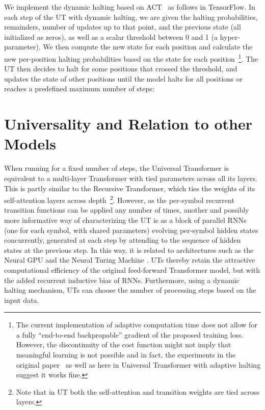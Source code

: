 We implement the dynamic halting based on ACT~\citep{graves2016adaptive} as follows in TensorFlow. In each step of the UT with dynamic halting, we are given the halting probabilities, remainders, number of updates up to that point, and the previous state (all initialized as zeros), as well as a scalar threshold between 0 and 1 (a hyper-parameter). We then compute the new state for each position and calculate the new per-position halting probabilities based on the state for each position~\footnote{The current implementation of adaptive computation time does not allow for a fully ``end-to-end backpropable'' gradient of the proposed training loss. However, the discontinuity of the cost function might not imply that meaningful learning is not possible and in fact, the experiments in the original paper~\citep{graves2016adaptive} as well as here in Universal Transformer with adaptive halting suggest it works fine.}. The UT then decides to halt for some positions that crossed the threshold, and updates the state of other positions until the model halts for all positions or reaches a predefined maximum number of steps:



\section{Universality and Relation to other Models}
\label{sec:related}
When running for a fixed number of steps, the Universal Transformer is equivalent to a multi-layer Transformer with tied parameters across all its layers. This is partly similar to the Recursive Transformer, which ties the weights of its self-attention layers across depth~\citep{gulcehre2018hyperbolic}\footnote{Note that in UT both the self-attention and transition weights are tied across layers.}. However, as the per-symbol recurrent transition functions can be applied any number of times, another and possibly more informative way of characterizing the UT is as a block of parallel RNNs (one for each symbol, with shared parameters) evolving per-symbol hidden states concurrently, generated at each step by attending to the sequence of hidden states at the previous step. In this way, it is related to architectures such as the Neural GPU \citep{neural_gpu} and the Neural Turing Machine \citep{ntm14}. UTs thereby retain the attractive computational efficiency of the original feed-forward Transformer model, but with the added recurrent inductive bias of RNNs. Furthermore, using a dynamic halting mechanism, UTs can choose the number of processing steps based on the input data. %

